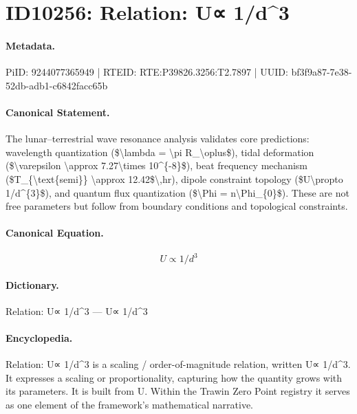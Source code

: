 \section*{ID10256: Relation: U∝ 1/d\textasciicircum{}3}
\paragraph{Metadata.}
PiID: 9244077365949 | RTEID: RTE:P39826.3256:T2.7897 | UUID: bf3f9a87-7e38-52db-adb1-c6842facc65b

\paragraph{Canonical Statement.}
The lunar–terrestrial wave resonance analysis validates core predictions: wavelength quantization (\$\textbackslash{}lambda = \textbackslash{}pi R\_\textbackslash{}oplus\$), tidal deformation (\$\textbackslash{}varepsilon \textbackslash{}approx 7.27\textbackslash{}times 10\textasciicircum{}\{-8\}\$), beat frequency mechanism (\$T\_\{\textbackslash{}text\{semi\}\} \textbackslash{}approx 12.42\$\textbackslash{},hr), dipole constraint topology (\$U\textbackslash{}propto 1/d\textasciicircum{}\{3\}\$), and quantum flux quantization (\$\textbackslash{}Phi = n\textbackslash{}Phi\_\{0\}\$). These are not free parameters but follow from boundary conditions and topological constraints.

\paragraph{Canonical Equation.}
\[
U\propto 1/d^{3}
\]

\paragraph{Dictionary.}
Relation: U∝ 1/d\textasciicircum{}3 — U∝ 1/d\textasciicircum{}3

\paragraph{Encyclopedia.}
Relation: U∝ 1/d\textasciicircum{}3 is a scaling / order-of-magnitude relation, written U∝ 1/d\textasciicircum{}3. It expresses a scaling or proportionality, capturing how the quantity grows with its parameters. It is built from U. Within the Trawin Zero Point registry it serves as one element of the framework's mathematical narrative.
